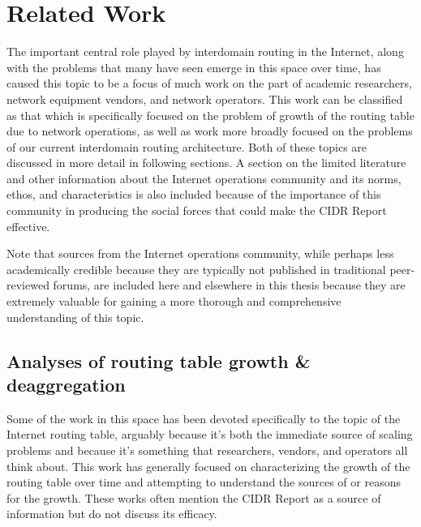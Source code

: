 \chapter{Related Work}
\label{chap:relwork}

The important central role played by interdomain routing in the Internet, along
with the problems that many have seen emerge in this space over time, has
caused this topic to be a focus of much work on the part of academic
researchers, network equipment vendors, and network operators. This work can be
classified as that which is specifically focused on the problem of growth of
the routing table due to network operations, as well as work more broadly
focused on the problems of our current interdomain routing architecture. Both
of these topics are discussed in more detail in following sections. A section
on the limited literature and other information about the Internet operations
community and its norms, ethos, and characteristics is also included because of
the importance of this community in producing the social forces that could make
the CIDR Report effective.

Note that sources from the Internet operations community, while perhaps less
academically credible because they are typically not published in traditional
peer-reviewed forums, are included here and elsewhere in this thesis because
they are extremely valuable for gaining a more thorough and comprehensive
understanding of this topic.


\section{Analyses of routing table growth \& deaggregation}

Some of the work in this space has been devoted specifically to the topic of
the Internet routing table, arguably because it's both the immediate source of
scaling problems and because it's something that researchers, vendors, and
operators all think about. This work has generally focused on characterizing
the growth of the routing table over time and attempting to understand the
sources of or reasons for the growth. These works often mention the CIDR Report
as a source of information but do not discuss its efficacy.

